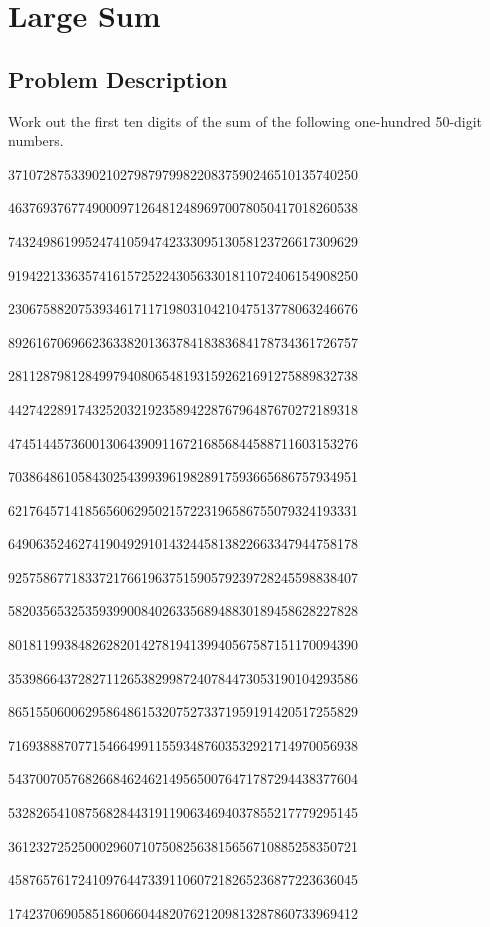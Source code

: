 \section{Large Sum}
\subsection{Problem Description}
Work out the first ten digits of the sum of the following one-hundred 50-digit numbers.
\begin{center}
37107287533902102798797998220837590246510135740250

46376937677490009712648124896970078050417018260538

74324986199524741059474233309513058123726617309629

91942213363574161572522430563301811072406154908250

23067588207539346171171980310421047513778063246676

89261670696623633820136378418383684178734361726757

28112879812849979408065481931592621691275889832738

44274228917432520321923589422876796487670272189318

47451445736001306439091167216856844588711603153276

70386486105843025439939619828917593665686757934951

62176457141856560629502157223196586755079324193331

64906352462741904929101432445813822663347944758178

92575867718337217661963751590579239728245598838407

58203565325359399008402633568948830189458628227828

80181199384826282014278194139940567587151170094390

35398664372827112653829987240784473053190104293586

86515506006295864861532075273371959191420517255829

71693888707715466499115593487603532921714970056938

54370070576826684624621495650076471787294438377604

53282654108756828443191190634694037855217779295145

36123272525000296071075082563815656710885258350721

45876576172410976447339110607218265236877223636045

17423706905851860660448207621209813287860733969412


\end{center}
